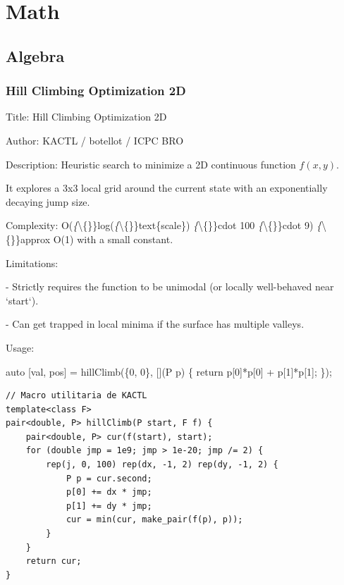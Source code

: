 \documentclass[10pt,landscape,twocolumn]{article}
\begin{document}
\section{Math}

\subsection{Algebra}

\subsubsection{Hill Climbing Optimization 2D}
\begin{flushleft}
\footnotesize\ttfamily
\par\noindent Title: Hill Climbing Optimization 2D
\par\noindent Author: KACTL / botellot / ICPC BRO
\par\noindent Description: Heuristic search to minimize a 2D continuous function $f(x, y)$.
\par\noindent It explores a 3x3 local grid around the current state with an exponentially decaying jump size.
\par\noindent Complexity: O(\textsl\{\textbackslash\{\}\}log(\textsl\{\textbackslash\{\}\}text\{scale\}) \textsl\{\textbackslash\{\}\}cdot 100 \textsl\{\textbackslash\{\}\}cdot 9) \textsl\{\textbackslash\{\}\}approx O(1) with a small constant.
\par\noindent Limitations:
\par\noindent - Strictly requires the function to be unimodal (or locally well-behaved near `start`).
\par\noindent - Can get trapped in local minima if the surface has multiple valleys.
\par\noindent Usage:
\par\noindent auto [val, pos] = hillClimb(\{0, 0\}, [](P p) \{ return p[0]*p[0] + p[1]*p[1]; \});
\end{flushleft}

\begin{lstlisting}
// Macro utilitaria de KACTL
template<class F> 
pair<double, P> hillClimb(P start, F f) {
    pair<double, P> cur(f(start), start);
    for (double jmp = 1e9; jmp > 1e-20; jmp /= 2) {
        rep(j, 0, 100) rep(dx, -1, 2) rep(dy, -1, 2) {
            P p = cur.second;
            p[0] += dx * jmp;
            p[1] += dy * jmp;
            cur = min(cur, make_pair(f(p), p));
        }
    }
    return cur;
}
\end{lstlisting}
\end{document}
